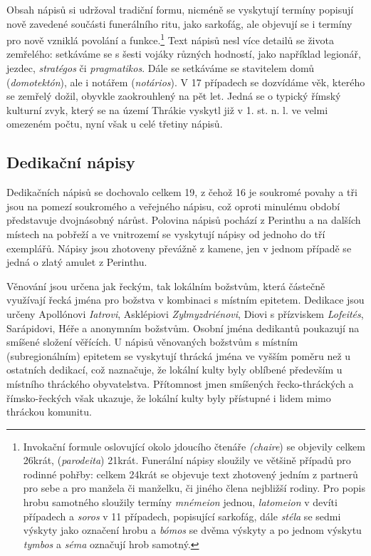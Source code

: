 Obsah nápisů si udržoval tradiční formu, nicméně se vyskytují termíny popisují nově zavedené součásti funerálního ritu, jako sarkofág, ale objevují se i termíny pro nově vzniklá povolání a funkce.\footnote{Invokační formule oslovující okolo jdoucího čtenáře {\em (chaire}) se objevily celkem 26krát, ({\em parodeita}) 21krát. Funerální nápisy sloužily ve většině případů pro rodinné pohřby: celkem 24krát se objevuje text zhotovený jedním z partnerů pro sebe a pro manžela či manželku, či jiného člena nejbližší rodiny. Pro popis hrobu samotného sloužily termíny {\em mnémeion} jednou, {\em latomeion} v devíti případech a {\em soros} v 11 případech, popisující sarkofág, dále {\em stéla} se sedmi výskyty jako označení hrobu a {\em bómos} se dvěma výskyty a po jednom výskytu {\em tymbos} a {\em séma} označují hrob samotný.} Text nápisů nesl více detailů se života zemřelého: setkáváme se s šesti vojáky různých hodností, jako například legionář, jezdec, {\em stratégos} či {\em pragmatikos}. Dále se setkáváme se stavitelem domů ({\em domotektón}), ale i notářem ({\em notários}). V 17 případech se dozvídáme věk, kterého se zemřelý dožil, obyvkle zaokrouhlený na pět let. Jedná se o typický římský kulturní zvyk, který se na území Thrákie vyskytl již v 1. st. n. l. ve velmi omezeném počtu, nyní však u celé třetiny nápisů.

\subsection[dedikační-nápisy-12]{Dedikační nápisy}

Dedikačních nápisů se dochovalo celkem 19, z čehož 16 je soukromé povahy a tři jsou na pomezí soukromého a veřejného nápisu, což oproti minulému období představuje dvojnásobný nárůst. Polovina nápisů pochází z Perinthu a na dalších místech na pobřeží a ve vnitrozemí se vyskytují nápisy od jednoho do tří exemplářů. Nápisy jsou zhotoveny převážně z kamene, jen v jednom případě se jedná o zlatý amulet z Perinthu.

Věnování jsou určena jak řeckým, tak lokálním božstvům, která částečně využívají řecká jména pro božstva v kombinaci s místním epitetem. Dedikace jsou určeny Apollónovi {\em Iatrovi}, Asklépiovi {\em Zylmyzdriénovi}, Diovi s přízviskem {\em Lofeités}, Sarápidovi, Héře a anonymním božstvům. Osobní jména dedikantů poukazují na smíšené složení věřících. U nápisů věnovaných božstvům s místním (subregionálním) epitetem se vyskytují thrácká jména ve vyšším poměru než u ostatních dedikací, což naznačuje, že lokální kulty byly oblíbené především u místního thráckého obyvatelstva. Přítomnost jmen smíšených řecko-thráckých a římsko-řeckých však ukazuje, že lokální kulty byly přístupné i lidem mimo thráckou komunitu.

